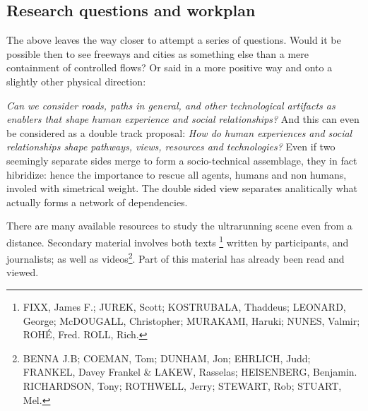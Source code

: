 \pagebreak
\subsection*{Research questions and workplan} 

The above leaves the way closer to attempt a series of questions.
Would it be possible then to see freeways and cities as something else than a mere containment of controlled flows?
Or said in a more positive way and onto a slightly other physical direction: \medskip
%

\textit{Can we consider roads, paths in general, and other technological artifacts as enablers that shape 
human experience and social relationships?} 
And this can even be considered as a double track proposal:
%
\textit{%
How do human experiences and social relationships %
shape pathways, views, resources and technologies?
}
Even if two seemingly separate sides merge to form a socio-technical assemblage, they in fact hibridize: 
hence the importance to rescue all agents, humans and non humans, involed with simetrical weight. 
The double sided view separates analitically what actually forms a network of dependencies.
\medskip

There are many available resources to study the ultrarunning scene even from a distance.
Secondary material involves both texts%
\footnote{FIXX, James F.; JUREK, Scott; KOSTRUBALA, Thaddeus; LEONARD, George; McDOUGALL, Christopher; MURAKAMI, Haruki; NUNES, Valmir; ROHÉ, Fred. ROLL, Rich.}  
written by participants, and journalists; as well as videos\footnote{BENNA J.B; COEMAN, Tom; DUNHAM, Jon; EHRLICH, Judd; FRANKEL, Davey Frankel \& LAKEW, Rasselas; HEISENBERG, Benjamin. RICHARDSON, Tony; ROTHWELL, Jerry; STEWART, Rob; STUART, Mel.}.
Part of this material has already been read and viewed. 

